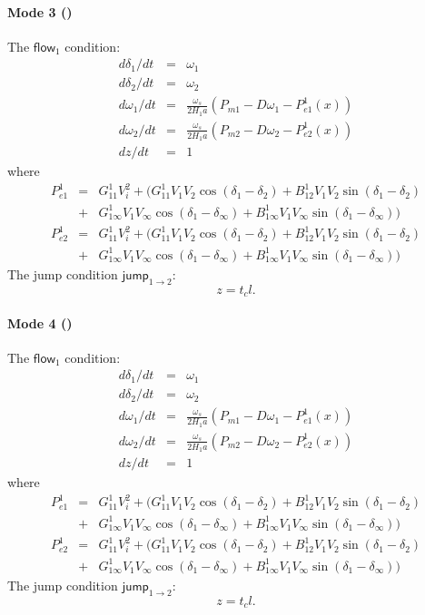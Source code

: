 \documentclass[envcountsect]{llncs}
\newcommand{\flow}{\mathsf{flow}}
\newcommand{\jump}{\mathsf{jump}}
\begin{document}
\paragraph{Mode 3 ()}
The $\flow_1$ condition:
\begin{eqnarray*}
d\delta_1/dt &=& \omega_1\\
d\delta_2/dt &=& \omega_2\\
d\omega_1/dt &=& \frac{\omega_s}{2H_1a}(P_{m1} - D\omega_1 - P_{e1}^1(x))\\
d\omega_2/dt &=& \frac{\omega_s}{2H_1a}(P_{m2} - D\omega_2 - P_{e2}^1(x))\\
dz/dt &=& 1
\end{eqnarray*}
where
\begin{eqnarray*}
P_{e1}^1 &=& G_{11}^1V_i^2 + \Big(G_{11}^1 V_1V_2\cos(\delta_1-\delta_2) +
B_{12}^1 V_1V_2\sin(\delta_1-\delta_2)\\
&+& G_{1\infty}^1
V_1V_{\infty}\cos(\delta_1-\delta_{\infty}) + B_{1\infty}^1
V_1V_{\infty}\sin(\delta_1-\delta_{\infty}) \Big)\\
P_{e2}^1 &=& G_{11}^1V_i^2 + \Big(G_{11}^1 V_1V_2\cos(\delta_1-\delta_2) +
B_{12}^1 V_1V_2\sin(\delta_1-\delta_2)\\
&+& G_{1\infty}^1
V_1V_{\infty}\cos(\delta_1-\delta_{\infty}) + B_{1\infty}^1
V_1V_{\infty}\sin(\delta_1-\delta_{\infty}) \Big)
\end{eqnarray*}
The jump condition $\jump_{1 \rightarrow 2}:$
$$z = t_cl.$$


\paragraph{Mode 4 ()}
The $\flow_1$ condition:
\begin{eqnarray*}
d\delta_1/dt &=& \omega_1\\
d\delta_2/dt &=& \omega_2\\
d\omega_1/dt &=& \frac{\omega_s}{2H_1a}(P_{m1} - D\omega_1 - P_{e1}^1(x))\\
d\omega_2/dt &=& \frac{\omega_s}{2H_1a}(P_{m2} - D\omega_2 - P_{e2}^1(x))\\
dz/dt &=& 1
\end{eqnarray*}
where
\begin{eqnarray*}
P_{e1}^1 &=& G_{11}^1V_i^2 + \Big(G_{11}^1 V_1V_2\cos(\delta_1-\delta_2) +
B_{12}^1 V_1V_2\sin(\delta_1-\delta_2)\\
&+& G_{1\infty}^1
V_1V_{\infty}\cos(\delta_1-\delta_{\infty}) + B_{1\infty}^1
V_1V_{\infty}\sin(\delta_1-\delta_{\infty}) \Big)\\
P_{e2}^1 &=& G_{11}^1V_i^2 + \Big(G_{11}^1 V_1V_2\cos(\delta_1-\delta_2) +
B_{12}^1 V_1V_2\sin(\delta_1-\delta_2)\\
&+& G_{1\infty}^1
V_1V_{\infty}\cos(\delta_1-\delta_{\infty}) + B_{1\infty}^1
V_1V_{\infty}\sin(\delta_1-\delta_{\infty}) \Big)
\end{eqnarray*}
The jump condition $\jump_{1 \rightarrow 2}:$
$$z = t_cl.$$
\end{document}
